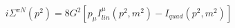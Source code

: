 \begin{equation}
i\Sigma ^{\pi N}(p^{2})=8G^{2}[p_{\mu }I_{lin}^{\mu
}(p^{2},m^{2})-I_{quad}(p^{2},m^{2})]
\end{equation}

